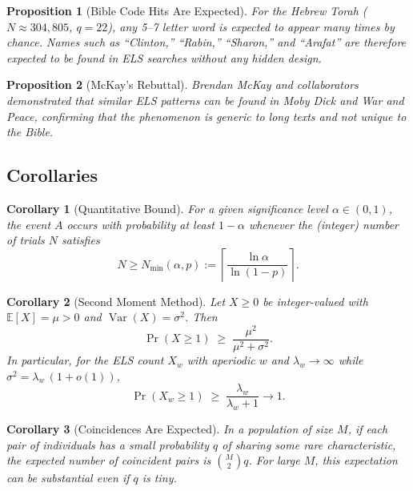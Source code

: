 \documentclass[11pt]{amsart}
\theoremstyle{plain}
\newtheorem{corollary}{Corollary}
\newtheorem{proposition}{Proposition}
\theoremstyle{remark}
\begin{document}
\begin{proposition}[Bible Code Hits Are Expected]
\label{prop:bible}
For the Hebrew Torah (\(N \approx 304{,}805\), \(q = 22\)), any 5--7
letter word is expected to appear many times by chance. Names such as
``Clinton,'' ``Rabin,'' ``Sharon,'' and ``Arafat'' are therefore expected
to be found in ELS searches without any hidden design.
\end{proposition}

\begin{proposition}[McKay's Rebuttal]
\label{prop:mckay}
Brendan McKay and collaborators demonstrated that similar ELS patterns can
be found in \emph{Moby Dick} and \emph{War and Peace}, confirming that the
phenomenon is generic to long texts and not unique to the Bible.
\end{proposition}

\subsection{Corollaries}

\begin{corollary}[Quantitative Bound]
\label{cor:bound}
For a given significance level \(\alpha \in (0,1)\), the event \(A\) occurs
with probability at least \(1-\alpha\) whenever the (integer) number of
trials \(N\) satisfies
\begin{equation}
\label{eq:min-trials}
N \ge N_{\min}(\alpha,p) := \left\lceil \frac{\ln \alpha}{\ln(1-p)} \right\rceil .
\end{equation}
\end{corollary}

\begin{corollary}[Second Moment Method]
\label{cor:second-moment}
Let \(X \ge 0\) be integer-valued with \(\mathbb{E}[X] = \mu > 0\) and
\(\operatorname{Var}(X) = \sigma^{2}\). Then
\begin{equation}
\label{eq:second-moment-cor}
\Pr(X \ge 1) \;\ge\; \frac{\mu^{2}}{\mu^{2} + \sigma^{2}}.
\end{equation}
In particular, for the ELS count \(X_w\) with aperiodic \(w\) and
\(\lambda_w \to \infty\) while \(\sigma^{2} = \lambda_w\,(1+o(1))\),
\begin{equation}
\label{eq:els-second}
\Pr(X_w \ge 1) \;\ge\; \frac{\lambda_w}{\lambda_w+1} \to 1.
\end{equation}
\end{corollary}

\begin{corollary}[Coincidences Are Expected]
\label{cor:coincidence}
In a population of size \(M\), if each pair of individuals has a small
probability \(q\) of sharing some rare characteristic, the expected number
of coincident pairs is \(\binom{M}{2} q\). For large \(M\), this expectation
can be substantial even if \(q\) is tiny.
\end{corollary}
\end{document}
